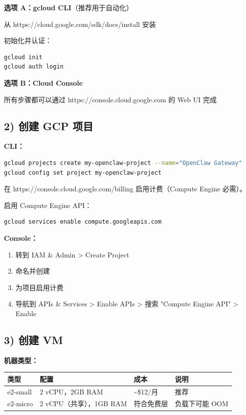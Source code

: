 \textbf{选项 A：gcloud CLI}（推荐用于自动化）

从 https://cloud.google.com/sdk/docs/install 安装

初始化并认证：

\begin{lstlisting}[language=bash]
gcloud init
gcloud auth login
\end{lstlisting}


\textbf{选项 B：Cloud Console}

所有步骤都可以通过 https://console.cloud.google.com 的 Web UI 完成

\hrulefill


\subsection{2) 创建 GCP 项目}


\textbf{CLI：}

\begin{lstlisting}[language=bash]
gcloud projects create my-openclaw-project --name="OpenClaw Gateway"
gcloud config set project my-openclaw-project
\end{lstlisting}


在 https://console.cloud.google.com/billing 启用计费（Compute Engine 必需）。

启用 Compute Engine API：

\begin{lstlisting}[language=bash]
gcloud services enable compute.googleapis.com
\end{lstlisting}


\textbf{Console：}

\begin{enumerate}
  \item 转到 IAM \& Admin > Create Project
  \item 命名并创建
  \item 为项目启用计费
  \item 导航到 APIs \& Services > Enable APIs > 搜索 "Compute Engine API" > Enable
\end{enumerate}


\hrulefill


\subsection{3) 创建 VM}


\textbf{机器类型：}


\begin{table}[h]
\centering
\small
\begin{tabular}{|l|l|l|l|}
\hline
类型 & 配置 & 成本 & 说明 \\
\hline
e2-small & 2 vCPU，2GB RAM & \textasciitilde{}\$12/月 & 推荐 \\
\hline
e2-micro & 2 vCPU（共享），1GB RAM & 符合免费层 & 负载下可能 OOM \\
\hline
\end{tabular}
\end{table}



